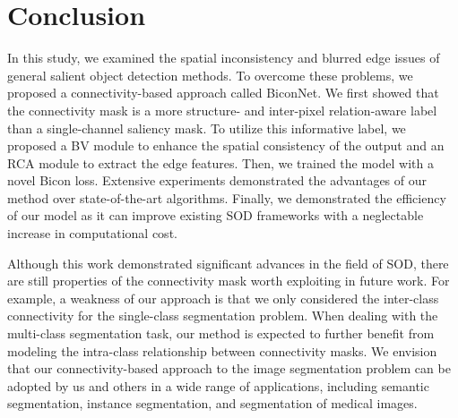 \documentclass[final]{cvpr}
\begin{document}
\section{Conclusion}

In this study, we examined the spatial inconsistency and blurred edge issues of general salient object detection methods. To overcome these problems, we proposed a connectivity-based approach called BiconNet. We first showed that the connectivity mask is a more structure- and inter-pixel relation-aware label than a single-channel saliency mask. To utilize this informative label, we proposed a BV module to enhance the spatial consistency of the output and an RCA module to extract the edge features. Then, we trained the model with a novel Bicon loss. Extensive experiments demonstrated the advantages of our method over state-of-the-art algorithms. Finally, we demonstrated the efficiency of our model as it can improve existing SOD frameworks with a neglectable increase in computational cost.

Although this work demonstrated significant advances in the field of SOD, there are still properties of the connectivity mask worth exploiting in future work. For example, a weakness of our approach is that we only considered the inter-class connectivity for the single-class segmentation problem. When dealing with the multi-class segmentation task, our method is expected to further benefit from modeling the intra-class relationship between connectivity masks. We envision that our connectivity-based approach to the image segmentation problem can be adopted by us and others in a wide range of applications, including semantic segmentation, instance segmentation, and segmentation of medical images.





{\small


}
\end{document}
